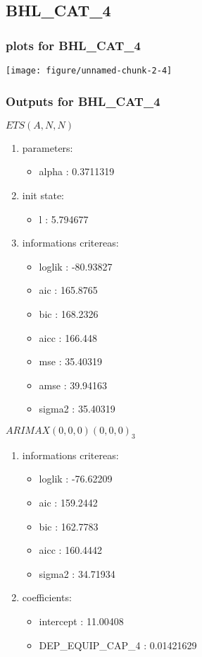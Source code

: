\documentclass[10pt,a4paper]{article}\usepackage[]{graphicx}\usepackage[]{color}
\makeatletter
\def\maxwidth{ %
  \ifdim\Gin@nat@width>\linewidth
    \linewidth
  \else
    \Gin@nat@width
  \fi
}
\newcommand{\AaA}{\_}
\makeatother
\begin{document}
\newpage
\subsection{BHL\AaA CAT\AaA 4}
\subsubsection{plots for BHL\AaA CAT\AaA 4}

\texttt{[image: figure/unnamed-chunk-2-4]} 

\newpage
\subsubsection{Outputs for BHL\AaA CAT\AaA 4}
\begin{multicols}{2}


$ ETS(A,N,N) $
\begin{enumerate}
\item parameters:
\begin{itemize}
\item  alpha :  0.3711319 
\end{itemize}
\item init state:
\begin{itemize}
\item  l :  5.794677 
\end{itemize}
\item informations critereas:
\begin{itemize}
\item  loglik :  -80.93827 
\item  aic :  165.8765 
\item  bic :  168.2326 
\item  aicc :  166.448 
\item  mse :  35.40319 
\item  amse :  39.94163 
\item  sigma2 :  35.40319 
\end{itemize}
\end{enumerate}

\columnbreak


 $ARIMAX(0,0,0)(0,0,0)_{3}$ 
\begin{enumerate}
\item informations critereas:
\begin{itemize}
\item  loglik :  -76.62209 
\item  aic :  159.2442 
\item  bic :  162.7783 
\item  aicc :  160.4442 
\item  sigma2 :  34.71934 
\end{itemize}

\item coefficients:
\begin{itemize}
\item  intercept :  11.00408 
\item  DEP\AaA EQUIP\AaA CAP\AaA 4 :  0.01421629 
\end{itemize}
\end{enumerate}
\end{multicols}
\end{document}
